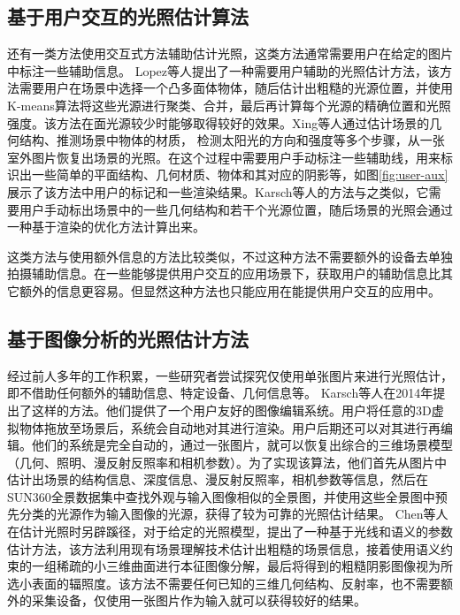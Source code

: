 \subsection{基于用户交互的光照估计算法}
还有一类方法使用交互式方法辅助估计光照，这类方法通常需要用户在给定的图片中标注一些辅助信息。
Lopez等人\cite{lopez2010compositing}提出了一种需要用户辅助的光照估计方法，该方法需要用户在场景中选择一个凸多面体物体，随后估计出粗糙的光源位置，并使用K-means算法将这些光源进行聚类、合并，最后再计算每个光源的精确位置和光照强度。该方法在面光源较少时能够取得较好的效果。Xing等人\cite{xing2013lighting}通过估计场景的几何结构、推测场景中物体的材质， 检测太阳光的方向和强度等多个步骤，从一张室外图片恢复出场景的光照。在这个过程中需要用户手动标注一些辅助线，用来标识出一些简单的平面结构、几何材质、物体和其对应的阴影等，如图\ref{fig:user-aux}展示了该方法中用户的标记和一些渲染结果。Karsch等人\cite{karsch2011rendering}的方法与之类似，它需要用户手动标出场景中的一些几何结构和若干个光源位置，随后场景的光照会通过一种基于渲染的优化方法计算出来。


这类方法与使用额外信息的方法比较类似，不过这种方法不需要额外的设备去单独拍摄辅助信息。在一些能够提供用户交互的应用场景下，获取用户的辅助信息比其它额外的信息更容易。但显然这种方法也只能应用在能提供用户交互的应用中。
\subsection{基于图像分析的光照估计方法}
经过前人多年的工作积累，一些研究者尝试探究仅使用单张图片来进行光照估计，即不借助任何额外的辅助信息、特定设备、几何信息等。
Karsch等人\cite{karsch2014automatic}在2014年提出了这样的方法。他们提供了一个用户友好的图像编辑系统。用户将任意的3D虚拟物体拖放至场景后，系统会自动地对其进行渲染。用户后期还可以对其进行再编辑。他们的系统是完全自动的，通过一张图片，就可以恢复出综合的三维场景模型（几何、照明、漫反射反照率和相机参数）。为了实现该算法，他们首先从图片中估计出场景的结构信息、深度信息、漫反射反照率，相机参数等信息，然后在SUN360全景数据集\cite{xiao2012recognizing}中查找外观与输入图像相似的全景图，并使用这些全景图中预先分类的光源作为输入图像的光源，获得了较为可靠的光照估计结果。
Chen等人\cite{chen2014lighting}在估计光照时另辟蹊径，对于给定的光照模型，提出了一种基于光线和语义的参数估计方法，该方法利用现有场景理解技术估计出粗糙的场景信息，接着使用语义约束的一组稀疏的小三维曲面进行本征图像分解，最后将得到的粗糙阴影图像视为所选小表面的辐照度。该方法不需要任何已知的三维几何结构、反射率，也不需要额外的采集设备，仅使用一张图片作为输入就可以获得较好的结果。


